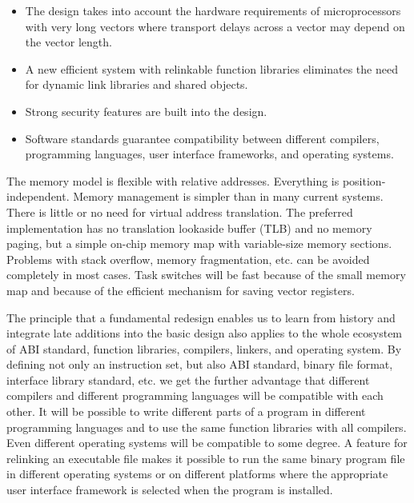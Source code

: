 \documentclass[forwardcom.tex]{subfiles}
\begin{document}
\begin{itemize}
\item The design takes into account the hardware requirements of microprocessors with very long vectors where transport delays across a vector may depend on the vector length.

\item A new efficient system with relinkable function libraries eliminates the need for dynamic link libraries and shared objects. 

\item Strong security features are built into the design.

\item Software standards guarantee compatibility between different compilers, programming languages, user interface frameworks, and operating systems.

\end{itemize}

The memory model is flexible with relative addresses. Everything is position-independent. Memory management is simpler than in many current systems. 
There is little or no need for virtual address translation. The preferred implementation has no translation lookaside buffer (TLB) and no memory paging, but a simple on-chip memory map with variable-size memory sections. Problems with stack overflow, memory fragmentation, etc. can be avoided completely in most cases. Task switches will be fast because of the small memory map and because of the efficient mechanism for saving vector registers. 
\vv

The principle that a fundamental redesign enables us to learn from history and integrate late additions into the basic design also applies to the whole ecosystem of ABI standard, function libraries, compilers, linkers, and operating system. By defining not only an instruction set, but also ABI standard, binary file format, interface library standard, etc. we get the further advantage that different compilers and different programming languages will be compatible with each other. It will be possible to write different parts of a program in different programming languages and to use the same function libraries with all compilers. Even different operating systems will be compatible to some degree. A feature for relinking an executable file makes it possible to run the same binary program file in different operating systems or on different platforms where the appropriate user interface framework is selected when the program is installed.
\vv
\end{document}
